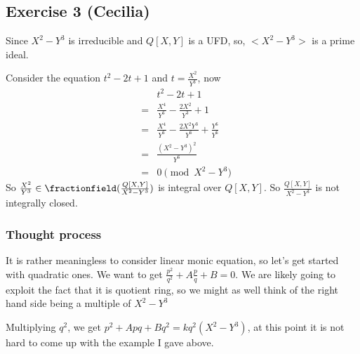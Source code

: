 \subsection*{Exercise 3 (Cecilia)}
Since $ X^2 - Y^3 $ is irreducible and $ Q[X, Y] $ is a UFD, so, $ <X^2 - Y^3> $ is a prime ideal.

Consider the equation $ t^2 - 2t + 1 $ and $ t = \frac{X^2}{Y^3} $, now 
\begin{eqnarray*}
  & & t^2 - 2t + 1 \\
  &=& \frac{X^4}{Y^6} - \frac{2X^2}{Y^3} + 1 \\
  &=& \frac{X^4}{Y^6} - \frac{2X^2Y^3}{Y^6} + \frac{Y^6}{Y^6} \\
  &=& \frac{(X^2 - Y^3)^2}{Y^6}  \\
  &=& 0 \pmod{X^2 - Y^3} 
\end{eqnarray*}
So $ \frac{X^2}{Y^3} \in \fractionfield(\frac{Q[X,Y]}{X^2 - Y^3}) $ is integral over $ Q[X,Y] $. So $ \frac{Q[X,Y]}{X^2 - Y^3} $ is not integrally closed.
\subsubsection{Thought process}
It is rather meaningless to consider linear monic equation, so let's get started with quadratic ones. We want to get
$ \frac{p^2}{q^2} + A\frac{p}{q} + B = 0 $. We are likely going to exploit the fact that it is quotient ring, so we might as well think of the right hand side being a multiple of $ X^2 - Y^3 $

Multiplying $ q^2 $, we get $ p^2 + Apq + Bq^2 = kq^2(X^2 - Y^3) $, at this point it is not hard to come up with the example I gave above.
